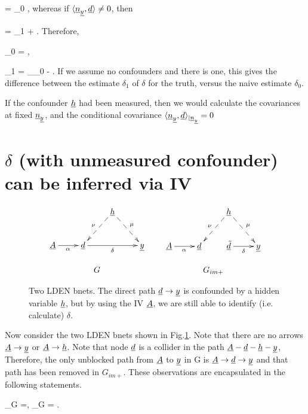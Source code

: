\beq
\av{\rvy, \rvd} = \delta_0 \av{\rvd, \rvd}
\;,
\eeq
whereas if
$\langle{\underline{n}}_{\underline{y}}, {\underline{d}}\rangle\neq 0$, then

\beq
\av{\rvy, \rvd} = \delta_1 \av{\rvd, \rvd}
+ \av{\rvn_\rvy, \rvd}
\;.
\eeq
Therefore,


\beq
\delta_0 = \frac{\av{\rvy, \rvd}}{\av{\rvd, \rvd}}
\;,
\eeq

\beq
\delta_1 =
\underbrace{\frac{\av{\rvy, \rvd}}{\av{\rvd, \rvd}}}_{\delta_0}
-
\frac{\av{\rvn_\rvy, \rvd}}{\av{\rvd, \rvd}}
\;.
\eeq  
If we assume no confounders
and there is one, this gives the difference
between the estimate $\delta_1$ of $\delta$ for
the truth, versus
the naive estimate $\delta_0$.

If the confounder ${\underline{h}}$
had been measured, then
we would calculate 
the covariances at fixed ${\underline{n}}_{\underline{y}}$,
and 
the conditional covariance 
$\langle{\underline{n}}_{\underline{y}}, {\underline{d}}\rangle_{|{\underline{n}}_{\underline{y}}}=0$

\section*{$\delta$
(with unmeasured confounder)
can be
inferred via IV}



\begin{figure}[h!]
$$
\begin{array}{ccc}
\xymatrix{
&&\rvh\ar@{-->}[dl]_\nu\ar@{-->}[dr]^\mu
\\
\rvA\ar[r]_\alpha
&\rvd\ar[rr]_\delta
&&\rvy
}
&&
\xymatrix{
&&\rvh\ar@{-->}[dl]_\nu\ar@{-->}[dr]^\mu
\\
\rvA\ar[r]_\alpha
&\rvd&
\rvtd\ar[r]_\delta
&\rvy}
\\
\\
G&&G_{im+}
\end{array}
$$
\caption{
Two LDEN bnets. The direct path ${\underline{d}}\rightarrow{\underline{y}}$
is confounded by
a hidden variable ${\underline{h}}$, but
by using the IV ${\underline{A}}$, we are still
able to 
identify (i.e. calculate)
$\delta$.
}
\label{fig-iv-G-im}
\end{figure}

Now consider the two LDEN bnets 
shown in Fig.\ref{fig-iv-G-im}.
Note that there are no arrows
${\underline{A}}\rightarrow{\underline{y}}$
or 
${\underline{A}}\rightarrow{\underline{h}}$. Note that
node ${\underline{d}}$ is a collider
in the path 
${\underline{A}}-{\underline{d}}-{\underline{h}}-{\underline{y}}$, 
Therefore,
the only unblocked path
from ${\underline{A}}$ to 
${\underline{y}}$ in G 
is ${\underline{A}}\rightarrow{\underline{d}}\rightarrow{\underline{y}}$
and that path has been
removed in $G_{im+}$. These
observations are 
encapsulated in the following statements.

\beq
\rvd\perp_{G} \rvy =, 
\;\; \rvA\perp_{G} \rvy= 
\;.
\eeq

